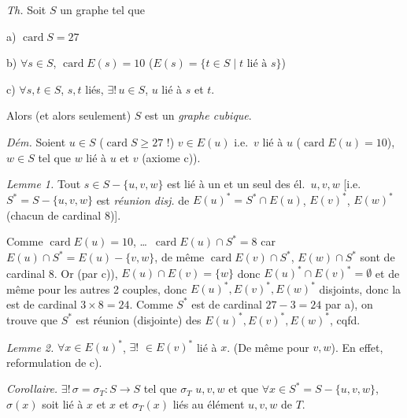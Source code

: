 \documentclass[11pt,a4paper]{article}
\begin{document}

\emph{Th.} Soit $S$ un graphe tel que

a) $\operatorname{card} S = 27$

b) $\forall s \in S$, $\operatorname{card} E(s) = 10$ \quad ($E(s) = \lbrace t
\in S \mid t \text{ lié à } s \rbrace$)

c) $\forall s, t \in S$, $s, t$ liés, $\exists!\, u \in S$, $u$ lié à $s$ et $t$.

Alors (et alors seulement) $S$ est un \emph{graphe cubique}.

\emph{Dém.} Soient $u \in S$ ($\operatorname{card} S
\geqslant 27$ !) $v \in E(u)$ i.e.\ $v$ lié à $u$ ($\operatorname{card} E(u) =
10$), $w \in S$ tel que $w$ lié à $u$ et $v$ (axiome c)). 

\emph{Lemme 1.} Tout $s \in S - \lbrace u, v, w \rbrace$  est lié
à un et un seul des él.\ $u, v, w$ [i.e.\ $S^{*} = S - \lbrace u, v, w \rbrace$
est \emph{réunion disj.} de $E(u)^{*} = S^{*} \cap E(u)$, $E(v)^{*}$, $E(w)^{*}$
(chacun de cardinal 8)].

Comme $\operatorname{card} E(u) = 10$,  \ldots\ $\operatorname{card}
E(u) \cap S^{*} = 8$ car $E(u) \cap S^{*} = E(u) - \lbrace v, w \rbrace$, de même
$\operatorname{card} E(v) \cap S^{*}$, $E(w) \cap S^{*}$  sont de cardinal 8. Or (par c)), $E(u) \cap E(v) = \lbrace w
\rbrace$ donc $E(u)^{*} \cap E(v)^{*} = \emptyset$ et de même pour les autres 2
couples, donc $E(u)^{*}, E(v)^{*}, E(w)^{*}$ disjoints, donc la
\struck{\ill{}}  est de cardinal $3 \times 8 = 24$. Comme $S^{*}$
est de cardinal $27 - 3 = 24$ par a), on trouve que $S^{*}$ est réunion
(disjointe) des $E(u)^{*}, E(v)^{*}, E(w)^{*}$, cqfd.

\emph{Lemme 2.} $\forall x \in E(u)^{*}$, $\exists!$  $\in
E(v)^{*}$ lié à $x$. (De même pour $v, w$).
En effet,  reformulation de c).

\emph{Corollaire.} $\exists!\, \sigma = \sigma_T : S \to S$ tel que $\sigma_T$
 $u, v, w$ et que $\forall x \in S^{*} = S - \lbrace u,
v, w \rbrace$, $\sigma(x)$ soit lié à $x$ et $x$ et $\sigma_T(x)$ liés au
 élément $u, v, w$ de $T$.
\end{document}
